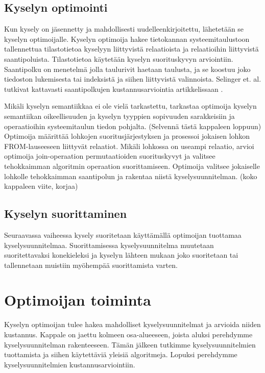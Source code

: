 \documentclass[finnish]{tktltiki2}
\theoremstyle{definition}
\theoremstyle{remark}
\begin{document}
\subsection{Kyselyn optimointi}
Kun kysely on jäsennetty ja mahdollisesti uudelleenkirjoitettu, lähetetään se kyselyn optimoijalle. Kyselyn optimoija hakee tietokannan systeemitaulustoon tallennettua tilastotietoa kyselyyn liittyvistä relaatioista ja relaatioihin liittyvistä saantipoluista. Tilastotietoa käytetään kyselyn suorituskyvyn arviointiin. Saantipolku on menetelmä jolla taulurivit haetaan taulusta, ja se koostuu joko tiedoston lukemisesta tai indeksistä ja siihen liittyvistä valinnoista. Selinger et. al. tutkivat kattavasti saantipolkujen kustannusarviointia artikkelissaan \cite{selinger1979access}. 

Mikäli kyselyn semantiikkaa ei ole vielä tarkastettu, tarkastaa optimoija kyselyn semantiikan oikeellisuuden ja kyselyn tyyppien sopivuuden sarakkeisiin ja operaatioihin systeemitaulun tiedon pohjalta. (Selvennä tästä kappaleen loppuun) Optimoija määrittää lohkojen suoritusjärjestyksen ja prosessoi jokaisen lohkon FROM-lauseeseen liittyvät relaatiot. Mikäli lohkossa on useampi relaatio, arvioi optimoija join-operaation permutaatioiden suorituskyvyt ja valitsee tehokkaimman algoritmin operaation suorittamiseen. Optimoija valitsee jokaiselle lohkolle tehokkaimman saantipolun ja rakentaa niistä kyselysuunnitelman. \cite{selinger1979access} (koko kappaleen viite, korjaa)

\subsection{Kyselyn suorittaminen}
Seuraavassa vaiheessa kysely suoritetaan käyttämällä optimoijan tuottamaa kyselysuunnitelmaa. Suorittamisessa kyselysuunnitelma muutetaan suoritettavaksi konekieleksi ja kyselyn lähteen mukaan joko suoritetaan tai tallennetaan muistiin myöhempää suorittamista varten. 

\section{Optimoijan toiminta} %
Kyselyn optimoijan tulee hakea mahdolliset kyselysuunnitelmat ja arvioida niiden kustannus. Kappale on jaettu kolmeen osa-alueeseen, joista aluksi perehdymme kyselysuunnitelman rakenteeseen. Tämän jälkeen tutkimme kyselysuunnitelmien tuottamista ja siihen käytettäviä yleisiä algoritmeja. Lopuksi perehdymme kyselysuunnitelmien kustannusarviointiin.
\end{document}
